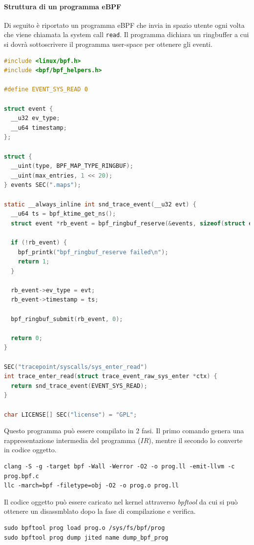 \documentclass{article}
\begin{document}
\paragraph{Struttura di un programma eBPF} Di seguito è riportato un programma eBPF che invia in spazio utente ogni volta che viene chiamata la system call \texttt{read}. Il programma dichiara un ringbuffer a cui si dovrà sottoscrivere il programma user-space per ottenere gli eventi.
\begin{lstlisting}[language=C, caption={Esempio di un programma eBPF che invia in user-space tutte le operazioni sys\_enter\_read}]
#include <linux/bpf.h>
#include <bpf/bpf_helpers.h>

#define EVENT_SYS_READ 0

struct event {
  __u32 ev_type;
  __u64 timestamp;
};

struct {
  __uint(type, BPF_MAP_TYPE_RINGBUF);
  __uint(max_entries, 1 << 20);
} events SEC(".maps");

static __always_inline int snd_trace_event(__u32 evt) {
  __u64 ts = bpf_ktime_get_ns();
  struct event *rb_event = bpf_ringbuf_reserve(&events, sizeof(struct event), 0);

  if (!rb_event) {
    bpf_printk("bpf_ringbuf_reserve failed\n");
    return 1;
  }

  rb_event->ev_type = evt;
  rb_event->timestamp = ts;

  bpf_ringbuf_submit(rb_event, 0);

  return 0;
}

SEC("tracepoint/syscalls/sys_enter_read")
int trace_enter_read(struct trace_event_raw_sys_enter *ctx) {
  return snd_trace_event(EVENT_SYS_READ); 
}

char LICENSE[] SEC("license") = "GPL";
\end{lstlisting}

Questo programma può essere compilato in $2$ fasi. Il primo comando genera una rappresentazione intermedia del programma ($IR$), mentre il secondo lo converte in codice oggetto.
\begin{verbatim}
clang -S -g -target bpf -Wall -Werror -O2 -o prog.ll -emit-llvm -c prog.bpf.c 
llc -march=bpf -filetype=obj -O2 -o prog.o prog.ll
\end{verbatim}

Il codice oggetto può essere caricato nel kernel attraverso \textit{bpftool} da cui si può ottenere un disassmblato dopo la fase di compilazione e verifica.

\begin{verbatim}
sudo bpftool prog load prog.o /sys/fs/bpf/prog
sudo bpftool prog dump jited name dump_bpf_prog
\end{verbatim}
\end{document}
